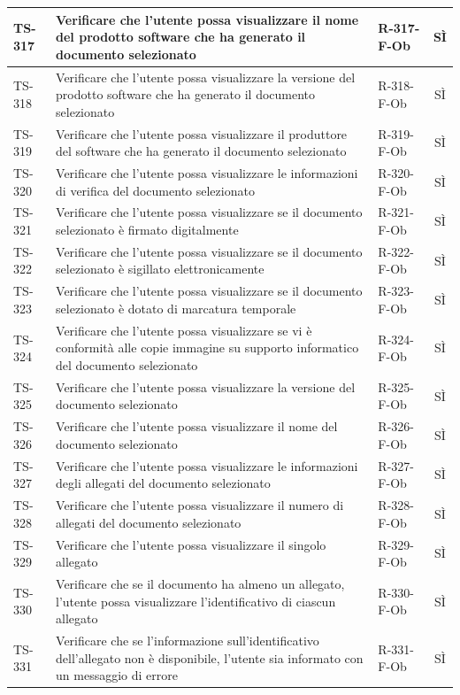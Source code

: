 \documentclass[a4paper,12pt]{article}
\begin{document}
\begin{longtable}{|p{1.5cm}|p{8.3cm}|p{2.4cm}|c|}
\hline
TS-317 & Verificare che l'utente possa visualizzare il nome del prodotto software che ha generato il documento selezionato & R-317-F-Ob & SÌ \\
\hline
TS-318 & Verificare che l'utente possa visualizzare la versione del prodotto software che ha generato il documento selezionato & R-318-F-Ob & SÌ \\
\hline
TS-319 & Verificare che l'utente possa visualizzare il produttore del software che ha generato il documento selezionato & R-319-F-Ob & SÌ \\
\hline
TS-320 & Verificare che l'utente possa visualizzare le informazioni di verifica del documento selezionato & R-320-F-Ob & SÌ \\
\hline
TS-321 & Verificare che l'utente possa visualizzare se il documento selezionato è firmato digitalmente & R-321-F-Ob & SÌ \\
\hline
TS-322 & Verificare che l'utente possa visualizzare se il documento selezionato è sigillato elettronicamente & R-322-F-Ob & SÌ \\
\hline
TS-323 & Verificare che l'utente possa visualizzare se il documento selezionato è dotato di marcatura temporale & R-323-F-Ob & SÌ \\
\hline
TS-324 & Verificare che l'utente possa visualizzare se vi è conformità alle copie immagine su supporto informatico del documento selezionato & R-324-F-Ob & SÌ \\
\hline
TS-325 & Verificare che l'utente possa visualizzare la versione del documento selezionato & R-325-F-Ob & SÌ \\
\hline
TS-326 & Verificare che l'utente possa visualizzare il nome del documento selezionato & R-326-F-Ob & SÌ \\
\hline
TS-327 & Verificare che l'utente possa visualizzare le informazioni degli allegati del documento selezionato & R-327-F-Ob & SÌ \\
\hline
TS-328 & Verificare che l'utente possa visualizzare il numero di allegati del documento selezionato & R-328-F-Ob & SÌ \\
\hline
TS-329 & Verificare che l'utente possa visualizzare il singolo allegato & R-329-F-Ob & SÌ \\
\hline
TS-330 & Verificare che se il documento ha almeno un allegato, l'utente possa visualizzare l'identificativo di ciascun allegato & R-330-F-Ob & SÌ \\
\hline
TS-331 & Verificare che se l'informazione sull'identificativo dell'allegato non è disponibile, l'utente sia informato con un messaggio di errore & R-331-F-Ob & SÌ \\

\end{longtable}
\end{document}
